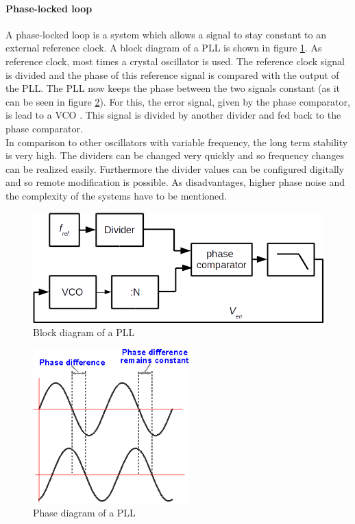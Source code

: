 \paragraph{Phase-locked loop\\}
A phase-locked loop is a system which allows a signal to stay constant to an external reference clock. A block diagram of a PLL is shown in figure \ref{fig:pllblocks}. As reference clock, most times a crystal oscillator is used. The reference clock signal is divided and the phase of this reference signal is compared with the output of the PLL. The PLL now keeps the phase between the two signals constant (as it can be seen in figure \ref{fig:pllphase}). For this, the error signal, given by the phase comparator, is lead to a VCO . This signal is divided by another divider and fed back to the phase comparator.\\
In comparison to other oscillators with variable frequency, the long term stability is very high. The dividers can be changed very quickly and so frequency changes can be realized easily. Furthermore the divider values can be configured digitally and so remote modification is possible. As disadvantages, higher phase noise and the complexity of the systems have to be mentioned.
\begin{figure}[htbp]
\begin{center}
\includegraphics[width=12cm,keepaspectratio=true]{bilder/png/PLLblocks}
\caption{Block diagram of a PLL}
\label{fig:pllblocks}
\end{center}
\end{figure}
\begin{figure}[htbp]
\begin{center}
\includegraphics[width=6cm,keepaspectratio=true]{bilder/png/PLLphase}
\caption{Phase diagram of a PLL}
\label{fig:pllphase}
\end{center}
\end{figure}